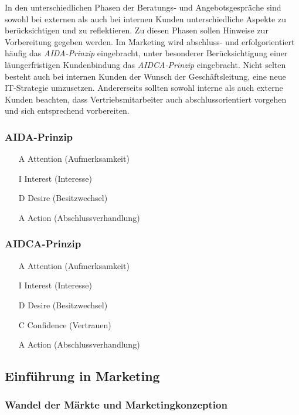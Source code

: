 \documentclass[a4paper, 12pt]{report}
\begin{document}
In den unterschiedlichen Phasen der Beratungs- und Angebotsgespräche sind sowohl
bei externen als auch bei internen Kunden unterschiedliche Aspekte zu
berücksichtigen und zu reflektieren. Zu diesen Phasen sollen Hinweise zur
Vorbereitung gegeben werden. Im Marketing wird abschluss- und erfolgorientiert
häufig das \emph{AIDA-Prinzip} eingebracht, unter besonderer Berücksichtigung
einer läungerfristigen Kundenbindung das \emph{AIDCA-Prinzip} eingebracht. Nicht
selten besteht auch bei internen Kunden der Wunsch der Geschäftsleitung, eine
neue IT-Strategie umzusetzen. Andererseits sollten sowohl interne als auch
externe Kunden beachten, dass Vertriebsmitarbeiter auch abschlussorientiert
vorgehen und sich entsprechend vorbereiten. \\

\subsubsection{AIDA-Prinzip}

\begin{itemize}
    \item[A] Attention (Aufmerksamkeit)
    \item[I] Interest (Interesse)
    \item[D] Desire (Besitzwechsel)
    \item[A] Action (Abschlussverhandlung)
\end{itemize}

\subsubsection{AIDCA-Prinzip}

\begin{itemize}
    \item[A] Attention (Aufmerksamkeit)
    \item[I] Interest (Interesse)
    \item[D] Desire (Besitzwechsel)
    \item[C] Confidence (Vertrauen)
    \item[A] Action (Abschlussverhandlung)
\end{itemize}

\subsection{Einführung in Marketing}

\subsubsection{Wandel der Märkte und Marketingkonzeption}
\end{document}
